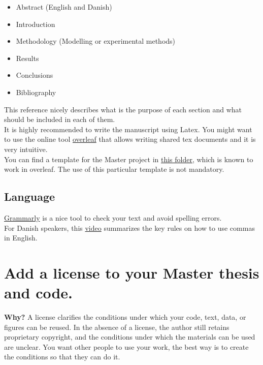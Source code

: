 \documentclass[3p]{elsarticle} %
\begin{document}
\begin{itemize}
\item Abstract (English and Danish)
\item Introduction
\item Methodology (Modelling or experimental methods) 
\item Results
\item Conclusions
\item Bibliography
\end{itemize}

This reference \cite{Socolofsky_2004} nicely describes what is the purpose of each section and what should be included in each of them. \\

It is highly recommended to write the manuscript using Latex. You might want to use the online tool \href{https://es.overleaf.com}{overleaf} that allows writing shared tex documents and it is very intuitive.\\

You can find a template for the Master project in \href{https://github.com/martavp/resources_master/blob/master/LatexTemplate_MasterThesisProject.zip}{this folder}, which is known to work in overleaf. The use of this particular template is not mandatory.

\subsection{Language}

\href{https://app.grammarly.com/}{Grammarly} is a nice tool to check your text and avoid spelling errors. \\

For Danish speakers, this \href{https://www.youtube.com/watch?v=I_i9bvv3N4M}{video} summarizes the key rules on how to use commas in English. 


\section{Add a license to your Master thesis and code.}
 
\textbf{Why?} A license clarifies the conditions under which your code, text, data, or figures can be reused. In the absence of a license, the author still retains proprietary copyright, and the conditions under which the materials can be used are unclear. You want other people to use your work, the best way is to create the conditions so that they can do it. \\
\end{document}

